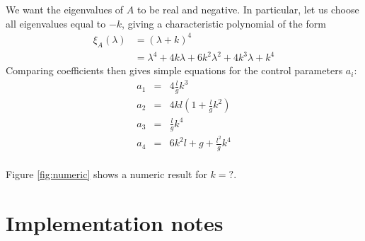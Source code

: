 \documentclass[a4paper]{article}
\begin{document}
We want the eigenvalues of $A$ to be real and negative. In particular, let us choose all eigenvalues equal to $-k$, giving a characteristic polynomial of the form
\begin{equation}
\begin{split}
\xi_A(\lambda) &= (\lambda + k)^4\\
&= \lambda^4 + 4k\lambda + 6k^2\lambda^2 + 4 k^3\lambda + k^4
\end{split}
\end{equation}
Comparing coefficients then gives simple equations for the control parameters $a_i$:
\begin{eqnarray}
a_1 &=& 4 \frac{l}{g} k^3\\
a_2 &=& 4 k l \left(1 + \frac{l}{g} k^2\right)\\
a_3 &=& \frac{l}{g} k^4\\
a_4 &=& 6 k^2 l + g + \frac{l^2}{g} k^4\\
\end{eqnarray}

Figure \ref{fig:numeric} shows a numeric result for $k = ?$.

\section{Implementation notes}
\end{document}
